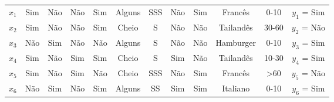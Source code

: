\begin{center}
\begin{adjustbox}{max width=\textwidth}
\begin{tabular}{|cccccccccccc|}
        \multicolumn{1}{|c|}{${x_1}$}                     & \multicolumn{1}{|c|}{Sim}          & \multicolumn{1}{|c|}{Não} & \multicolumn{1}{|c|}{Não}         & \multicolumn{1}{|c|}{Sim}  & \multicolumn{1}{|c|}{Alguns}   & \multicolumn{1}{|c|}{SSS}   & \multicolumn{1}{|c|}{Não}   & \multicolumn{1}{|c|}{Sim}     & \multicolumn{1}{|c|}{Francês}    & \multicolumn{1}{|c|}{0-10}        & \multicolumn{1}{|c|}{$y_1$ = Sim}                     \\ 
        \multicolumn{1}{|c|}{${x_2}$}                     & \multicolumn{1}{|c|}{Sim}          & \multicolumn{1}{|c|}{Não} & \multicolumn{1}{|c|}{Não}         & \multicolumn{1}{|c|}{Sim}  & \multicolumn{1}{|c|}{Cheio}    & \multicolumn{1}{|c|}{S}     & \multicolumn{1}{|c|}{Não}   & \multicolumn{1}{|c|}{Não}     & \multicolumn{1}{|c|}{Tailandês}  & \multicolumn{1}{|c|}{30-60}       & \multicolumn{1}{|c|}{$y_2$ = Não}                     \\ 
        \multicolumn{1}{|c|}{${x_3}$}                     & \multicolumn{1}{|c|}{Não}          & \multicolumn{1}{|c|}{Sim} & \multicolumn{1}{|c|}{Não}         & \multicolumn{1}{|c|}{Não}  & \multicolumn{1}{|c|}{Alguns}   & \multicolumn{1}{|c|}{S}     & \multicolumn{1}{|c|}{Não}   & \multicolumn{1}{|c|}{Não}     & \multicolumn{1}{|c|}{Hamburger}  & \multicolumn{1}{|c|}{0-10}        & \multicolumn{1}{|c|}{$y_3$ = Sim}                     \\ 
        \multicolumn{1}{|c|}{${x_4}$}                     & \multicolumn{1}{|c|}{Sim}          & \multicolumn{1}{|c|}{Não} & \multicolumn{1}{|c|}{Sim}         & \multicolumn{1}{|c|}{Sim}  & \multicolumn{1}{|c|}{Cheio}    & \multicolumn{1}{|c|}{S}     & \multicolumn{1}{|c|}{Sim}   & \multicolumn{1}{|c|}{Não}     & \multicolumn{1}{|c|}{Tailandês}  & \multicolumn{1}{|c|}{10-30}       & \multicolumn{1}{|c|}{$y_4$ = Sim}                     \\ 
        \multicolumn{1}{|c|}{${x_5}$}                     & \multicolumn{1}{|c|}{Sim}          & \multicolumn{1}{|c|}{Não} & \multicolumn{1}{|c|}{Sim}         & \multicolumn{1}{|c|}{Não}  & \multicolumn{1}{|c|}{Cheio}    & \multicolumn{1}{|c|}{SSS}   & \multicolumn{1}{|c|}{Não}   & \multicolumn{1}{|c|}{Sim}     & \multicolumn{1}{|c|}{Francês}    & \multicolumn{1}{|c|}{>60}         & \multicolumn{1}{|c|}{$y_5$ = Não}                     \\ 
        \multicolumn{1}{|c|}{${x_6}$}                     & \multicolumn{1}{|c|}{Não}          & \multicolumn{1}{|c|}{Sim} & \multicolumn{1}{|c|}{Não}         & \multicolumn{1}{|c|}{Sim}  & \multicolumn{1}{|c|}{Alguns}   & \multicolumn{1}{|c|}{SS}    & \multicolumn{1}{|c|}{Sim}   & \multicolumn{1}{|c|}{Sim}     & \multicolumn{1}{|c|}{Italiano}   & \multicolumn{1}{|c|}{0-10}        & \multicolumn{1}{|c|}{$y_6$ = Sim}                     \\ 

\end{tabular}
\end{adjustbox}
\end{center}
